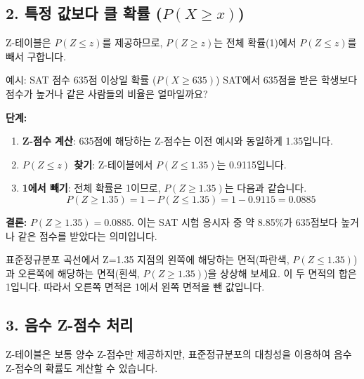 \documentclass[11pt,a4paper]{article}
\begin{document}
\subsection*{2. 특정 값보다 클 확률 ($P(X \ge x)$)}
Z-테이블은 $P(Z \le z)$를 제공하므로, $P(Z \ge z)$는 전체 확률(1)에서 $P(Z \le z)$를 빼서 구합니다.

\begin{examplebox}{예시: SAT 점수 635점 이상일 확률 ($P(X \ge 635)$)}
SAT에서 635점을 받은 학생보다 점수가 높거나 같은 사람들의 비율은 얼마일까요?

\textbf{단계:}
\begin{enumerate}
    \item \textbf{Z-점수 계산}: 635점에 해당하는 Z-점수는 이전 예시와 동일하게 1.35입니다.
    \item \textbf{$P(Z \le z)$ 찾기}: Z-테이블에서 $P(Z \le 1.35)$는 0.9115입니다.
    \item \textbf{1에서 빼기}: 전체 확률은 1이므로, $P(Z \ge 1.35)$는 다음과 같습니다.
    \[ P(Z \ge 1.35) = 1 - P(Z \le 1.35) = 1 - 0.9115 = 0.0885 \]
\end{enumerate}
\textbf{결론:} $P(Z \ge 1.35) = 0.0885$. 이는 SAT 시험 응시자 중 약 8.85\%가 635점보다 높거나 같은 점수를 받았다는 의미입니다.

\begin{tcolorbox}[title=\textbf{시각적 이해}, colback=blue!5!white, colframe=blue!75!black]
표준정규분포 곡선에서 Z=1.35 지점의 왼쪽에 해당하는 면적(파란색, $P(Z \le 1.35)$)과 오른쪽에 해당하는 면적(흰색, $P(Z \ge 1.35)$)을 상상해 보세요. 이 두 면적의 합은 1입니다. 따라서 오른쪽 면적은 1에서 왼쪽 면적을 뺀 값입니다.
\end{tcolorbox}
\end{examplebox}

\subsection*{3. 음수 Z-점수 처리}
Z-테이블은 보통 양수 Z-점수만 제공하지만, 표준정규분포의 대칭성을 이용하여 음수 Z-점수의 확률도 계산할 수 있습니다.
\end{document}
